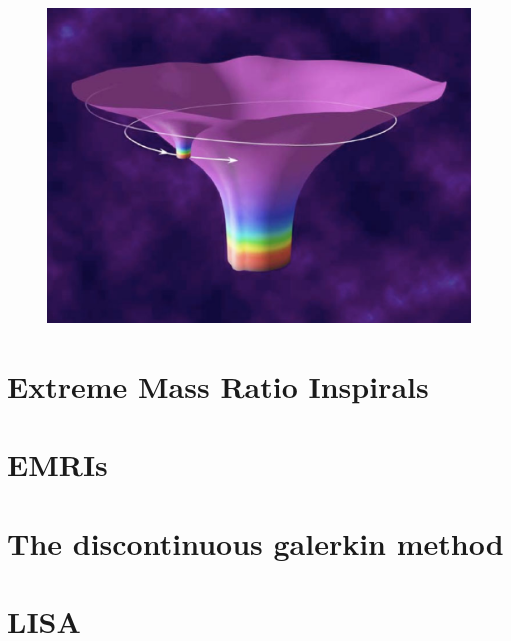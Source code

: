 \begin{figure}
  \includegraphics{EMRI}
\end{figure}




\section{Extreme Mass Ratio Inspirals}

\section{EMRIs}
\section{The discontinuous galerkin method}
\section{LISA}
